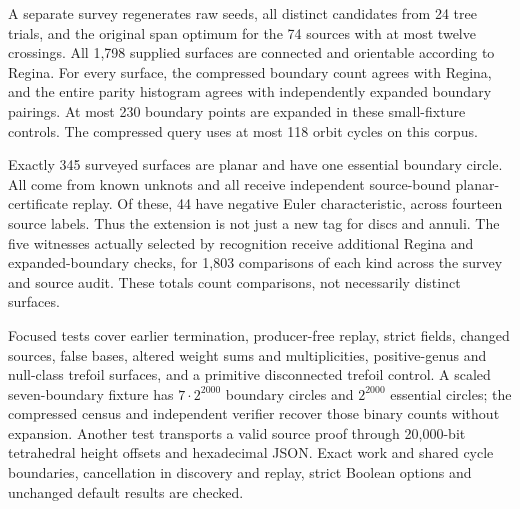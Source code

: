 A separate survey regenerates raw seeds, all distinct candidates from
24 tree trials, and the original span optimum for the 74 sources with at
most twelve crossings. All 1,798 supplied surfaces are connected and
orientable according to Regina. For every surface, the compressed
boundary count agrees with Regina, and the entire parity histogram agrees
with independently expanded boundary pairings. At most 230 boundary
points are expanded in these small-fixture controls. The compressed query
uses at most 118 orbit cycles on this corpus.

Exactly 345 surveyed surfaces are planar and have one essential boundary
circle. All come from known unknots and all receive independent
source-bound planar-certificate replay. Of these, 44 have negative Euler
characteristic, across fourteen source labels. Thus the extension is not
just a new tag for discs and annuli. The five witnesses actually selected
by recognition receive additional Regina and expanded-boundary checks,
for 1,803 comparisons of each kind across the survey and source audit.
These totals count comparisons, not necessarily distinct surfaces.

Focused tests cover earlier termination, producer-free replay, strict
fields, changed sources, false bases, altered weight sums and
multiplicities, positive-genus and null-class trefoil surfaces, and a
primitive disconnected trefoil control. A scaled seven-boundary fixture
has $7\cdot2^{2000}$ boundary circles and $2^{2000}$ essential circles;
the compressed census and independent verifier recover those binary
counts without expansion. Another test transports a valid source proof
through 20,000-bit tetrahedral height offsets and hexadecimal JSON.
Exact work and shared cycle boundaries, cancellation in discovery and
replay, strict Boolean options and unchanged default results are checked.


